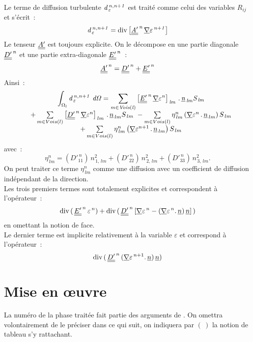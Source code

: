 Le terme de diffusion turbulente $\it{d}^{\,n,n+1}_{\,\varepsilon}$ est traité comme celui des
variables $R_{ij}$ et s'écrit~: $$\it{d}_{\,\varepsilon}^{\,n,n+1} = \text{div}\,{\left[
\underline{\underline{A'}}^{\,n}\,\underline{\nabla} {\varepsilon^{\,n+1}} \right]}$$
Le tenseur $\underline{\underline{A'}}$ est toujours explicite.
On le décompose en une partie diagonale $\underline{\underline{D'}}^{\,n}$ et une partie
extra-diagonale $\underline{\underline{E'}}^{\,n}$~:\\
$$\underline{\underline{A'}}^{\,n} =\underline{\underline{D'}}^{\,n} + \underline{\underline{E'}}^{\,n}$$
Ainsi~:
\begin{equation}
\begin{array} {lcl}
&\displaystyle \int_{\Omega_l} \it{d}_{\,\varepsilon}^{\,n,n+1}\ d\Omega =
\sum\limits_{m\in Vois(l)} \left[
\tens{E'}^{\,n}\,\grad{\varepsilon}^n
\right]_{\,lm}\,.\,\vect{n}_{\,lm}S_{\,lm}\\
& + \sum\limits_{m\in Vois(l)} \left[
\tens{D'}^{\,n}\,\grad{\varepsilon}^n
\right]_{\,lm}\,.\,\vect{n}_{\,lm}S_{\,lm}\
- \sum\limits_{m\in Vois(l)}
 \eta^n_{\,lm} \left(\grad{\varepsilon}^{n}\,.\,\vect{n}_{\,lm} \right) S_{\,lm}\\
&+  \sum\limits_{m\in Vois(l)} \eta^n_{\,lm} \left( \grad{\varepsilon}^{n+1}\,.\,\vect{n}_{\,lm} \right) S_{\,lm}
\end{array}
\end{equation}
avec~:
$$\eta^n_{\,lm} = (D'^{\,n}_{11})\,n^2_{\,1,\,lm} + (D'^{\,n}_{22})\,n^2_{\,2,\,lm} +
(D'^{\,n}_{33})\,n^2_{\,3,\,lm}.$$
On peut traiter ce terme $\eta^n_{\,lm}$ comme une diffusion avec un coefficient de diffusion indépendant de la direction.\\
Les trois premiers termes sont totalement explicites et correspondent à l'opérateur~:
$$\text{div}\, (\,\underline{\underline{E'}}^{\,n}\,\varepsilon^{\,n}) +
\text{div}\, (\,\underline{\underline{D'}}^{\,n}\,[\underline{\nabla}{\varepsilon^{\,n}} - (\underline{\nabla}{\varepsilon^{\,n}}.\,\underline{n})\,\underline{n}]\,)$$ en omettant la notion de face.\\
Le dernier terme est implicite relativement à la variable $\varepsilon$ et correspond à l'opérateur~:
 $$\text{div}\, (\,\underline{\underline{D'}}^{\,n}\,(\underline{\nabla}{\varepsilon^{\,n+1}}.\,\underline{n} )\,\underline{n})$$

\section*{Mise en \oe uvre}
La numéro de la phase traitée fait partie des arguments de . On
omettra volontairement de le préciser dans ce qui suit, on indiquera par $(\ )$ la
notion de tableau s'y rattachant.

